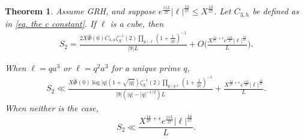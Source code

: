 \documentclass[11pt]{amsart}
\newtheorem{theorem}[prop]{Theorem}
\numberwithin{equation}{section}
\theoremstyle{remark}
\begin{document}
\begin{theorem}
\label{theorem S_2}
Assume GRH, and suppose $e^{\frac{11L}{27}}|\ell|^{\frac{14}{27}}\le X^{\frac{13}{27}}$.
Let $C_{3,h}$ be defined as in \eqref{eq. the c constant}.
If $\ell$ is a cube, then 
    \begin{align*}
    S_2
    =
    \frac{2X\widehat{\Phi}(0)C_{3, h}\zeta^{-1}_\mathcal{K}(2)  \prod_{p\mid \ell}(1+\frac{1}{|p|})^{-1}
    }{|9|L}
    +O\bigg(\frac{X^{\frac{14}{27}+\epsilon}e^{\frac{11L}{27}}|\ell|^{\frac{14}{27}}}{L} \bigg).
    \end{align*}

    
    When $\ell=qa^3$ or $\ell=q^2a^3$ for a unique prime $q$, 
    \begin{align*}
    S_2
    \ll
     \frac{X\widehat{\Phi}(0)\log|q|(1+\sqrt{|q|})\zeta^{-1}_\mathcal{K}(2)  \prod_{p\mid q \ell }(1+\frac{1}{|p|})^{-1}}{|9|(|q|-|q|^{-1/2})L} 
    + 
    \frac{X^{\frac{14}{27}+\epsilon}e^{\frac{11L}{27}}|\ell|^{\frac{14}{27}}}{L}.
    \end{align*}
    When neither is the case, 
    $$
    S_2
    \ll
    \frac{X^{\frac{14}{27}+\epsilon}e^{\frac{11L}{27}}|\ell|^{\frac{14}{27}}}{L}.$$
\end{theorem}
\end{document}
